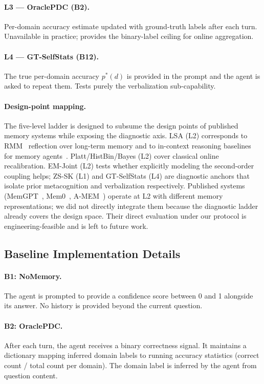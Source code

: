 \documentclass[11pt]{article}
\begin{document}
\paragraph{L3 --- OraclePDC (B2).} Per-domain accuracy estimate updated with ground-truth labels after each turn. Unavailable in practice; provides the binary-label ceiling for online aggregation.
\paragraph{L4 --- GT-SelfStats (B12).} The true per-domain accuracy $p^*(d)$ is provided in the prompt and the agent is asked to repeat them. Tests purely the verbalization sub-capability.

\paragraph{Design-point mapping.} The five-level ladder is designed to subsume the design points of published memory systems while exposing the diagnostic axis. LSA (L2) corresponds to RMM~\citep{tan2025rmm} reflection over long-term memory and to in-context reasoning baselines for memory agents~\citep{hu2026memoryagent}. Platt/HistBin/Bayes (L2) cover classical online recalibration. EM-Joint (L2) tests whether explicitly modeling the second-order coupling helps; ZS-SK (L1) and GT-SelfStats (L4) are diagnostic anchors that isolate prior metacognition and verbalization respectively. Published systems (MemGPT~\citep{packer2023memgpt}, Mem0~\citep{mem02025}, A-MEM~\citep{xu2025amem}) operate at L2 with different memory representations; we did not directly integrate them because the diagnostic ladder already covers the design space. Their direct evaluation under our protocol is engineering-feasible and is left to future work.


\subsection{Baseline Implementation Details}
\label{app:baselines_impl}

\paragraph{B1: NoMemory.} The agent is prompted to provide a confidence score between 0 and 1 alongside its answer. No history is provided beyond the current question.

\paragraph{B2: OraclePDC.} After each turn, the agent receives a binary correctness signal. It maintains a dictionary mapping inferred domain labels to running accuracy statistics (correct count / total count per domain). The domain label is inferred by the agent from question content.
\end{document}
